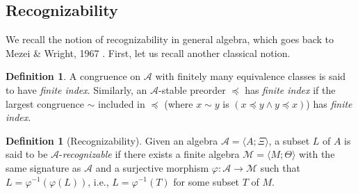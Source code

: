 \documentclass[11pt,a4paper]{article}
\newtheorem{proposition}[theorem]{Proposition}
\theoremstyle{definition} %
\newtheorem{definition}[theorem]{Definition}
\newtheorem{remark}[theorem]{Remark}
\newcommand\+[1]{\mathcal{#1}} %
\newcommand{\pat}{\color{red}}
\begin{document}


%


\subsection{Recognizability}\label{ss rec}
We recall the notion of recognizability in general algebra, 
which goes back to Mezei \& Wright, 1967 \cite{MezeiWright67}.
%
First, let us recall another classical notion.
\begin{definition}
A congruence on $\+A$ with finitely many equivalence classes 
is said to have {\em finite index}.
Similarly,
an $\+A$-stable preorder $\preceq$ has {\em finite index} if the largest  congruence $\sim$ included in $\preceq$ 
(where $x\sim y$ is $(x\preceq y \wedge y\preceq x)$)
has {\em finite index}.
\end{definition}


\begin{definition} [Recognizability] \label{def:rec}
Given  an algebra $\+A=\langle A; \Xi\rangle$, %
a  subset $L$ of $A$ is said to be  %
$\+A$-{\em recognizable}
if there exists a finite algebra $\+M=\langle M;\Theta\rangle$ with the same signature  as $\+A$
and a surjective morphism $\varphi:\+A\to \+M$ such that 
$L =  \varphi^{-1}(\varphi(L))$, i.e., $L = \varphi^{-1}(T)$ for some subset $T$ of $M$.
\end{definition}
\end{document}
